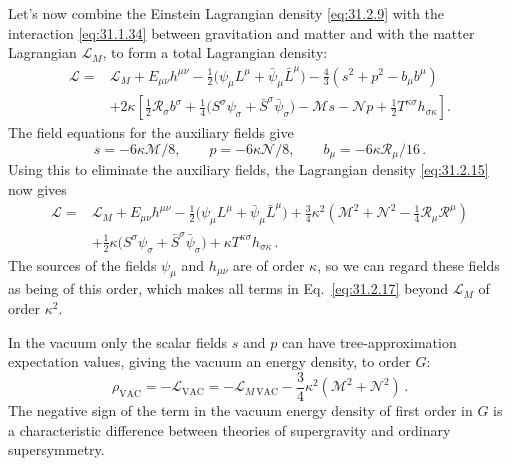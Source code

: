 Let's now combine the Einstein Lagrangian density \eqref{eq:31.2.9} with the
interaction\newline
\eqref{eq:31.1.34} between gravitation and matter and with the
matter Lagrangian \(\mathcal L_M\), to form a total Lagrangian density:
\begin{equation}
  \begin{aligned}
  \mathcal L={}&
    \mathcal L_M+E_{\mu\nu}h^{\mu\nu}
    -\frac12\bigl(\psi_\mu L^\mu
                  +\bar\psi_\mu\bar L^\mu\bigr)
    -\frac43(s^2+p^2-b_\mu b^\mu)
  \\
  &+2\kappa\left[
      \frac12\mathcal R_\sigma b^\sigma
      +\frac14\bigl(S^\sigma\psi_\sigma
                    +\bar S^\sigma\bar\psi_\sigma\bigr)
      -\mathcal M s-\mathcal Np
      +\frac12T^{\kappa\sigma}h_{\sigma\kappa}
    \right].
  \end{aligned}
  \tag{31.2.15}\label{eq:31.2.15}
\end{equation}
The field equations for the auxiliary fields give
\begin{equation}
  s=-6\kappa\mathcal M/8,\qquad
  p=-6\kappa\mathcal N/8,\qquad
  b_\mu=-6\kappa\mathcal R_\mu/16\,.
  \tag{31.2.16}\label{eq:31.2.16}
\end{equation}
Using this to eliminate the auxiliary fields, the Lagrangian density
\eqref{eq:31.2.15} now gives
\begin{equation}
  \begin{aligned}
  \mathcal L={}&
    \mathcal L_M+E_{\mu\nu}h^{\mu\nu}
    -\frac12\bigl(\psi_\mu L^\mu
                  +\bar\psi_\mu\bar L^\mu\bigr)
    +\frac34\kappa^2
     \left(\mathcal M^2+\mathcal N^2
           -\frac14\mathcal R_\mu\mathcal R^\mu\right)
  \\
  &+\frac12\kappa
    \bigl(S^\sigma\psi_\sigma+\bar S^\sigma\bar\psi_\sigma\bigr)
    +\kappa T^{\kappa\sigma}h_{\sigma\kappa}\,.
  \end{aligned}
  \tag{31.2.17}\label{eq:31.2.17}
\end{equation}
The sources of the fields \(\psi_\mu\) and \(h_{\mu\nu}\) are of order
\(\kappa\), so we can regard these fields as being of this order, which makes
all terms in Eq.~\eqref{eq:31.2.17} beyond \(\mathcal L_M\) of order
\(\kappa^2\).

In the vacuum only the scalar fields \(s\) and \(p\) can have
tree-approximation expectation values, giving the vacuum an energy density,
to order \(G\):
\begin{equation}
  \rho_{\mathrm{VAC}}
  =-\mathcal L_{\mathrm{VAC}}
  =-\mathcal L_{M\,\mathrm{VAC}}
   -\frac34\kappa^2(\mathcal M^2+\mathcal N^2)\,.
  \tag{31.2.18}\label{eq:31.2.18}
\end{equation}
The negative sign of the term in the vacuum energy density of first order in
\(G\) is a characteristic difference between theories of supergravity and
ordinary supersymmetry.

